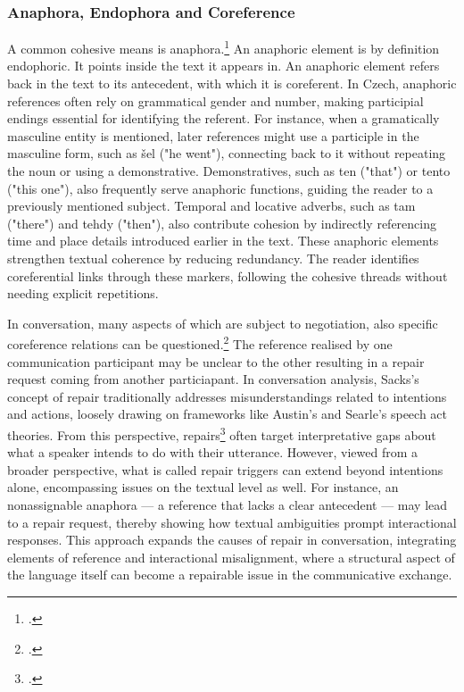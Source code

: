 \documentclass[12pt]{report}
\begin{document}
{\subsubsection{Anaphora, Endophora and Coreference}
\par
    A common cohesive means is anaphora.\footcite{Nedoluzhko2011}
        An anaphoric element is by definition endophoric.
        It points inside the text it appears in.
        An anaphoric element refers back in the text to its antecedent, with which it is coreferent.
    In Czech, anaphoric references often rely on grammatical gender and number,
    making participial endings essential for identifying the referent.
    For instance, when a gramatically masculine entity is mentioned,
    later references might use a participle in the masculine form, such as šel ("he went"),
    connecting back to it without repeating the noun or using a demonstrative.
    Demonstratives, such as ten ("that") or tento ("this one"),
    also frequently serve anaphoric functions, guiding the reader to a previously mentioned subject.
    Temporal and locative adverbs, such as tam ("there") and tehdy ("then"),
    also contribute cohesion by indirectly referencing time and place details introduced earlier in the text.
    These anaphoric elements strengthen textual coherence by reducing redundancy.
    The reader identifies coreferential links through these markers,
    following the cohesive threads without needing explicit repetitions.

\par
    In conversation, many aspects of which are subject to negotiation,
    also specific coreference relations can be questioned.\footcite{loaiciga2021reference}
    The reference realised by one communication participant may be unclear to the other
    resulting in a repair request coming from another particiapant.
    In conversation analysis,
    Sacks’s concept of repair traditionally addresses
    misunderstandings related to intentions and actions,
    loosely drawing on frameworks like Austin’s and Searle’s speech act theories.
    From this perspective, repairs\footcite{DINGEMANSE202430} often target interpretative gaps about
    what a speaker intends to do with their utterance.
    However, viewed from a broader perspective,
    what is called repair triggers can extend beyond intentions alone,
    encompassing issues on the textual level as well.
    For instance, an nonassignable anaphora —
    a reference that lacks a clear antecedent —
    may lead to a repair request,
    thereby showing how textual ambiguities prompt interactional responses.
    This approach expands the causes of repair in conversation,
    integrating elements of reference and interactional misalignment,
    where a structural aspect of the language itself can
    become a repairable issue in the communicative exchange.

}
\end{document}
